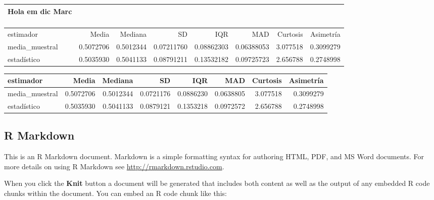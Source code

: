 \documentclass[
]{article}
\newenvironment{Shaded}{\begin{snugshade}}{\end{snugshade}}
\newcommand{\DataTypeTok}[1]{\textcolor[rgb]{0.13,0.29,0.53}{#1}}
\newcommand{\KeywordTok}[1]{\textcolor[rgb]{0.13,0.29,0.53}{\textbf{#1}}}
\newcommand{\NormalTok}[1]{#1}
\newcommand{\OperatorTok}[1]{\textcolor[rgb]{0.81,0.36,0.00}{\textbf{#1}}}
\newcommand{\OtherTok}[1]{\textcolor[rgb]{0.56,0.35,0.01}{#1}}
\newcommand{\StringTok}[1]{\textcolor[rgb]{0.31,0.60,0.02}{#1}}
\begin{document}
\captionsetup[table]{labelformat=empty,skip=1pt}
\begin{longtable}{lrrrrrrr}
\caption*{
\large Hola em dic Marc\\ 
\small \\ 
} \\ 
\toprule
estimador & Media & Mediana & SD & IQR & MAD & Curtosis & Asimetría \\ 
\midrule
media\_muestral & 0.5072706 & 0.5012344 & 0.07211760 & 0.08862303 & 0.06388053 & 3.077518 & 0.3099279 \\ 
estadístico & 0.5035930 & 0.5041133 & 0.08791211 & 0.13532182 & 0.09725723 & 2.656788 & 0.2748998 \\ 
\bottomrule
\end{longtable}

\begin{Shaded}
\end{Shaded}

\begin{longtable}{lrrrrrrr}
\toprule
estimador & Media & Mediana & SD & IQR & MAD & Curtosis & Asimetría\\
\midrule
media\_muestral & 0.5072706 & 0.5012344 & 0.0721176 & 0.0886230 & 0.0638805 & 3.077518 & 0.3099279\\
estadístico & 0.5035930 & 0.5041133 & 0.0879121 & 0.1353218 & 0.0972572 & 2.656788 & 0.2748998\\
\bottomrule
\end{longtable}

\hypertarget{r-markdown}{%
\subsection{R Markdown}\label{r-markdown}}

This is an R Markdown document. Markdown is a simple formatting syntax
for authoring HTML, PDF, and MS Word documents. For more details on
using R Markdown see \url{http://rmarkdown.rstudio.com}.

When you click the \textbf{Knit} button a document will be generated
that includes both content as well as the output of any embedded R code
chunks within the document. You can embed an R code chunk like this:
\end{document}
